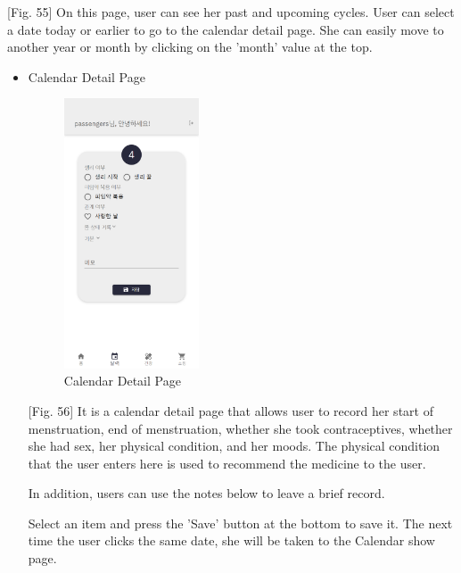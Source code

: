 \documentclass[conference]{IEEEtran}
\begin{document}
\begin{itemize}
    \setlength{\parindent}{2ex}[Fig. 55] On this page, user can see her past and upcoming cycles. User can select a date today or earlier to go to the calendar detail page. She can easily move to another year or month by clicking on the 'month' value at the top.
    \begin{itemize}
        \item Calendar Detail Page
        \begin{figure}[ht]
        \includegraphics[width=4cm, center]{usedetail.png}
        \caption{Calendar Detail Page}
        \label{fig56}
        \end{figure}
        [Fig. 56] It is a calendar detail page that allows user to record her start of menstruation, end of menstruation, whether she took contraceptives, whether she had sex, her physical condition, and her moods. The physical condition that the user enters here is used to recommend the medicine to the user.
        
       \setlength{\parindent}{2ex} In addition, users can use the notes below to leave a brief record.
        
        \setlength{\parindent}{2ex}Select an item and press the 'Save' button at the bottom to save it. The next time the user clicks the same date, she will be taken to the Calendar show page.


\end{itemize}
\end{itemize}
\end{document}
